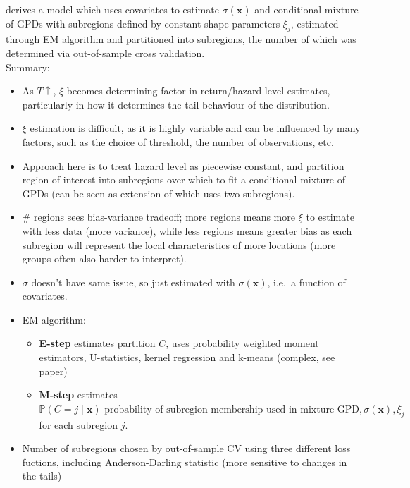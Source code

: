 \documentclass{article}
\numberwithin{equation}{section}
\begin{document}
\cite{Carreau2017} derives a model which uses covariates to estimate $\sigma(\bm{x})$ and conditional mixture of GPDs with subregions defined by constant shape parameters $\xi_j$, estimated through EM algorithm and partitioned into subregions, the number of which was determined via out-of-sample cross validation. \\
Summary:
\begin{itemize}
  \item As $T \uparrow$, $\xi$ becomes determining factor in return/hazard level estimates, particularly in how it determines the tail behaviour of the distribution.
  \item $\xi$ estimation is difficult, as it is highly variable and can be influenced by many factors, such as the choice of threshold, the number of observations, etc.
  \item Approach here is to treat hazard level as piecewise constant, and partition region of interest into subregions over which to fit a conditional mixture of GPDs (can be seen as extension of \cite{Cooley2007} which uses two subregions).
  \item \# regions sees bias-variance tradeoff; more regions means more $\xi$ to estimate with less data (more variance), while less regions means greater bias as each subregion will represent the local characteristics of more locations (more groups often also harder to interpret). 
  \item $\sigma$ doesn't have same issue, so just estimated with $\sigma(\bm{x})$, i.e.\ a function of covariates. 
  \item EM algorithm: \\
  \begin{itemize}
    \item \textbf{E-step} estimates partition $C$, uses probability weighted moment estimators, U-statistics, kernel regression and k-means (complex, see paper)
    \item \textbf{M-step} estimates $\mathbb{P}(C = j \mid \bm{x}) \text{ probability of subregion membership used in mixture GPD}, \sigma(\bm{x}), \xi_j$ for each subregion $j$.
  \end{itemize}
  \item Number of subregions chosen by out-of-sample CV using three different loss fuctions, including Anderson-Darling statistic (more sensitive to changes in the tails)
\end{itemize}
\end{document}
